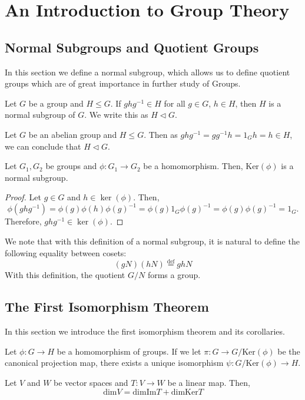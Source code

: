 \chapter[Group Theory]{An Introduction to Group Theory}
\section{Normal Subgroups and Quotient Groups}

In this section we define a normal subgroup, which allows us to define quotient groups which are of great importance in further study of Groups.

\begin{definition}
  Let $G$ be a group and $H \leq G$. If $ghg^{-1} \in H$ for all $g \in G$, $h \in H$, then $H$ is a normal subgroup of $G$. We write this as $H \lhd G$.
\end{definition}

\begin{example}
  Let $G$ be an abelian group and $H \leq G$. Then as $ghg^{-1}=gg^{-1}h=1_Gh=h \in H$, we can conclude that $H \lhd G$.  
\end{example}

\begin{theorem}
  Let $G_1, G_2$ be groups and $\phi : G_1 \rightarrow G_2$ be a homomorphism. Then, $\text{Ker}(\phi)$ is a normal subgroup.
\end{theorem}
\begin{proof}
  Let \( g \in G \) and \( h \in \ker(\phi) \). Then,
  \[
    \phi(ghg^{-1}) = \phi(g)\phi(h)\phi(g)^{-1} = \phi(g)1_G\phi(g)^{-1} = \phi(g)\phi(g)^{-1} = 1_G.
  \]
  Therefore, \( ghg^{-1} \in \ker(\phi) \).
\end{proof}

We note that with this definition of a normal subgroup, it is natural to define the following equality between cosets:
\[
  (gN)(hN)\overset{\text{def}}{=}ghN
\]
With this definition, the quotient $G/N$ forms a group.

\section{The First Isomorphism Theorem}

In this section we introduce the first isomorphism theorem and its corollaries.

\begin{theorem}
  Let $\phi: G \rightarrow H$ be a homomorphism of groups. If we let $\pi : G \rightarrow G/\text{Ker}(\phi)$ be the canonical projection map, there exists a unique isomorphism $\psi: G/\text{Ker}(\phi) \rightarrow H$.
\end{theorem}

\begin{corollary}
  Let $V$ and $W$ be vector spaces and $T:V\rightarrow W$ be a linear map. Then,
  \begin{equation*}
    \text{dim}V = \text{dim}\text{Im} T + \text{dim}\text{Ker}T
  \end{equation*}
\end{corollary}

